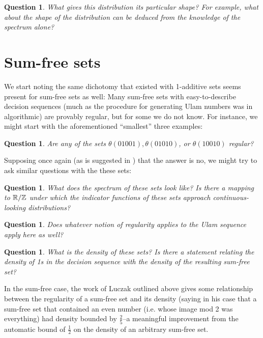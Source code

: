 \documentclass{report}
\newtheorem{question}[theorem]{Question}
\theoremstyle{remark}
\numberwithin{equation}{section}
\begin{document}
\begin{question}\label{qn:shape}
  What gives this distribution its particular shape?  For example,
  what about the shape of the distribution can be deduced from the
  knowledge of the spectrum alone?
\end{question}

\section{Sum-free sets}

We start noting the same dichotomy that existed with 1-additive sets
seems present for sum-free sets as well: Many sum-free sets with
easy-to-describe decision sequences (much as the procedure for
generating Ulam numbers was in algorithmic) are provably regular, but
for some we do not know.  For instance, we might start with the
aforementioned ``smallest'' three examples: 

\begin{question}\label{qn:sumfree_regularity}
  Are any of the sets $\theta(01001), \theta(01010)$, or
  $\theta(10010)$ regular?
\end{question}

Supposing once again (as is suggested in
\cite{calkin:int2005}) that the answer is no, we might try
to ask similar questions with the these sets:

\begin{question}\label{qn:sumfree_spectrum}
  What does the spectrum of these sets look like?  Is there a mapping
  to $\mathbb{R}/\mathbb{Z}$ under which the indicator functions of these sets
  approach continuous-looking distributions?
\end{question}

\begin{question}\label{qn:sumfree_new_regularity}
  Does whatever notion of regularity applies to the Ulam sequence
  apply here as well?
\end{question}

\begin{question}\label{qn:sumfree_density}
  What is the density of these sets?  Is there a statement relating
  the density of 1s in the decision sequence with the density of the
  resulting sum-free set?
\end{question}

In the sum-free case, the work of Luczak outlined above gives some
relationship between the regularity of a sum-free set and its density
(saying in his case that a sum-free set that contained an even number
(i.e. whose image mod 2 was everything) had density bounded by
$\frac25$--a meaningful improvement from the automatic bound of
$\frac12$ on the density of an arbitrary sum-free set.
\end{document}
